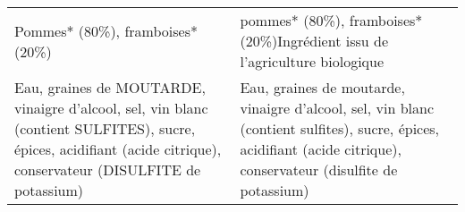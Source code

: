 \begin{tabular}{p{7cm}p{7cm}}
                                                                                                                                                                                                                                                                                                                                                                                                                                                                                                                                                                                                                                                                                                                                                                                Pommes* (80\%), framboises* (20\%) &                                                                                                                                                                                                                                                                                                                                                                                                                                                                                                                                                                                                                                                                                                                             pommes* (80\%), framboises* (20\%)\newline *Ingrédient issu de l'agriculture biologique \\
                                                                                                                                                                                                                                                                                                                                                                                                                                                                                                                                                                                                                                              Eau, graines de MOUTARDE, vinaigre d'alcool, sel, vin blanc (contient SULFITES), sucre, épices, acidifiant (acide citrique), conservateur (DISULFITE de potassium) &                                                                                                                                                                                                                                                                                                                                                                                                                                                                                                                                                                                                                                         Eau, graines de moutarde, vinaigre d'alcool, sel, vin blanc (contient sulfites), sucre, épices, acidifiant (acide citrique), conservateur (disulfite de potassium) \\

\end{tabular}
